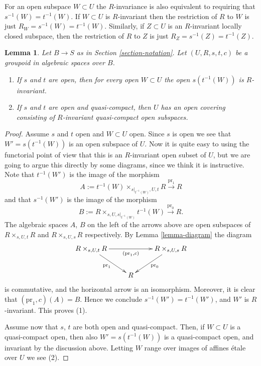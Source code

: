 \documentclass{stacks-project}
\theoremstyle{plain}
\newtheorem{lemma}[subsection]{Lemma}
\theoremstyle{definition}
\theoremstyle{remark}
\numberwithin{equation}{subsection}
\begin{document}
\noindent
For an open subspace $W \subset U$ the $R$-invariance
is also equivalent to requiring that $s^{-1}(W) = t^{-1}(W)$.
If $W \subset U$ is $R$-invariant then the restriction of $R$ to
$W$ is just $R_W = s^{-1}(W) = t^{-1}(W)$. Similarly, if $Z \subset U$
is an $R$-invariant locally closed subspace, then the restriction of $R$
to $Z$ is just $R_Z = s^{-1}(Z) = t^{-1}(Z)$.

\begin{lemma}
\label{lemma-constructing-invariant-opens}
Let $B \to S$ as in Section \ref{section-notation}.
Let $(U, R, s, t, c)$ be a groupoid in algebraic spaces over $B$.
\begin{enumerate}
\item If $s$ and $t$ are open, then for every open $W \subset U$
the open $s(t^{-1}(W))$ is $R$-invariant.
\item If $s$ and $t$ are open and quasi-compact, then $U$ has an open
covering consisting of $R$-invariant quasi-compact open subspaces.
\end{enumerate}
\end{lemma}

\begin{proof}
Assume $s$ and $t$ open and $W \subset U$ open.
Since $s$ is open we see that $W' = s(t^{-1}(W))$ is an open subspace of $U$.
Now it is quite easy to using the functorial point of view
that this is an $R$-invariant open subset of $U$, but we are going to argue
this directly by some diagrams, since we think it is instructive.
Note that $t^{-1}(W')$ is the image of the morphism
$$
A := t^{-1}(W) \times_{s|_{t^{-1}(W)}, U, t} R
\xrightarrow{\text{pr}_1} R
$$
and that $s^{-1}(W')$ is the image of the morphism
$$
B := R \times_{s, U, s|_{t^{-1}(W)}} t^{-1}(W)
\xrightarrow{\text{pr}_0} R.
$$
The algebraic spaces $A$, $B$
on the left of the arrows above are open subspaces of
$R \times_{s, U, t} R$ and $R \times_{s, U, s} R$ respectively.
By Lemma \ref{lemma-diagram} the diagram
$$
\xymatrix{
R \times_{s, U, t} R \ar[rd]_{\text{pr}_1} \ar[rr]_{(\text{pr}_1, c)} & &
R \times_{s, U, s} R \ar[ld]^{\text{pr}_0} \\
& R &
}
$$
is commutative, and the horizontal arrow is an isomorphism. Moreover, it is
clear that $(\text{pr}_1, c)(A) = B$. Hence we conclude
$s^{-1}(W') = t^{-1}(W')$, and $W'$ is $R$-invariant. This proves (1).

\medskip\noindent
Assume now that $s$, $t$ are both open and quasi-compact.
Then, if $W \subset U$ is a quasi-compact open, then also
$W' = s(t^{-1}(W))$ is a quasi-compact open, and invariant by the
discussion above. Letting $W$ range over images of affines \'etale over $U$
we see (2).
\end{proof}
\end{document}
